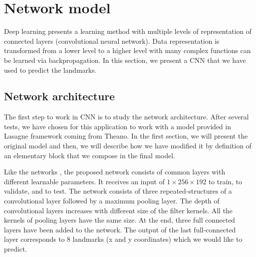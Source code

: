 \documentclass[10pt]{article}
\begin{document}

\section{Network model}
Deep learning presents a learning method with multiple levels of representation of connected layers (convolutional neural network). Data representation is transformed from a lower level to a higher level with many complex functions can be learned via backpropagation. In this section, we present a CNN that we have used to predict the landmarks.
\subsection{Network architecture}
\label{secmodel}
The first step to work in CNN is to study the network architecture. After several tests, we have chosen for this application to work with a model provided in Lasagne framework coming from Theano. In the first section, we will present the original model and then, we will describe how we have modified it by definition of an elementary block that we compose in the final model.

Like the networks \cite{lecun2010convolutional, li2015convolutional, cintas2016automatic}, the proposed network consists of common layers with different learnable parameters. It receives an input of $1 \times 256 \times 192$ to train, to validate, and to  test. The network consists of three repeated-structures of a convolutional layer followed by a maximum pooling layer. The depth
of convolutional layers increases with different size of the filter kernels.
All the kernels of pooling layers have the same size. 
At the end, three full connected layers have been added to the
network. %
 The output of the last full-connected
layer corresponds to 8 landmarks (x and y coordinates) which
we would like to predict. 
\end{document}
